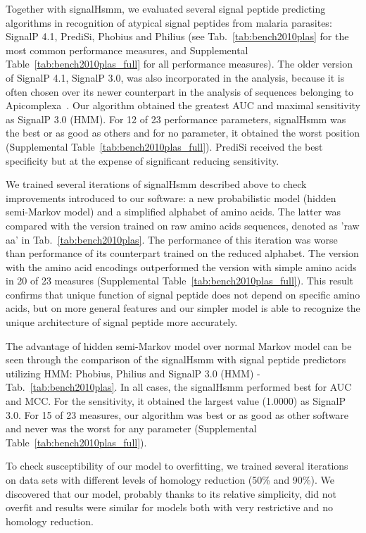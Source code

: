 \documentclass[10pt,letterpaper]{article}
\begin{document}
Together with signalHsmm, we evaluated several signal peptide predicting algorithms in recognition of atypical signal peptides from malaria parasites: SignalP 4.1, PrediSi, Phobius and Philius (see Tab.~\ref{tab:bench2010plas} for the most common performance measures, and Supplemental Table~\ref{tab:bench2010plas_full} for all performance measures). The older version of SignalP 4.1, SignalP 3.0, was also incorporated in the analysis, because it is often chosen over its newer counterpart in the analysis of sequences belonging to Apicomplexa~\cite{2012cilingirapicoap}. Our algorithm obtained the greatest AUC and maximal sensitivity as SignalP 3.0 (HMM). For 12 of 23 performance parameters, signalHsmm was the best or as good as others and for no parameter, it obtained the worst position (Supplemental Table~\ref{tab:bench2010plas_full}). PrediSi received the best specificity but at the expense of significant reducing sensitivity.

We trained several iterations of signalHsmm  described above to check improvements introduced to our software: a new probabilistic model (hidden semi-Markov model) and a simplified alphabet of amino acids. The latter was compared with the version trained on raw amino acids sequences, denoted as 'raw aa' in Tab.~\ref{tab:bench2010plas}. The performance of this iteration was  worse than performance of its counterpart trained on the reduced alphabet. The version with the amino acid encodings outperformed the version with simple amino acids in 20 of 23 measures (Supplemental Table~\ref{tab:bench2010plas_full}). This result confirms that unique function of signal peptide does not depend on specific amino acids, but on more general features and our simpler model is able to recognize the unique architecture of signal peptide more accurately.

The advantage of hidden semi-Markov model over normal Markov model can be seen through the comparison of the signalHsmm with signal peptide predictors utilizing HMM: Phobius, Philius and SignalP 3.0 (HMM) - Tab.~\ref{tab:bench2010plas}. In all cases, the signalHsmm performed best for AUC and MCC. For the sensitivity, it obtained the largest value (1.0000) as SignalP 3.0. For 15 of 23 measures, our algorithm was best or as good as other software and never was the worst for any parameter (Supplemental Table~\ref{tab:bench2010plas_full}).

To check susceptibility of our model to overfitting, we trained several iterations on data sets with different levels of homology reduction (50\% and 90\%). We discovered that our model, probably thanks to its relative simplicity, did not overfit and results were similar for models both with very restrictive and no homology reduction.
\end{document}
